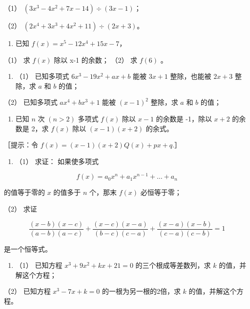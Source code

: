 （1） \((3x^{3} - 4x^{2} + 7x - 14) \div (3x - 1)\)；

（2） \((2x^{4} + 3x^{3} + 4x^{2} + 11) \div (2x + 3)\)。

\begin{enumerate}[start=2]
\item
  已知 \(f(x) = x^5 - 12x^4 + 15x - 7\)，
\end{enumerate}

（1） 求 \(f(x)\) 除以 x-1 的余数； （2） 求 \(f(6)\) 。

\begin{enumerate}[start=3]
\item
  （1） 已知多项式 \(6x^{3} - 19x^{2} + ax + b\) 能被 \(3x + 1\)
  整除，也能被 \(2x + 3\) 整除，求 \(a\) 和 \(b\) 的值；
\end{enumerate}

（2） 已知多项式 \(ax^4 + bx^3 + 1\) 能被 \((x - 1)^2\) 整除，求 \(a\)
和 \(b\) 的值；

\begin{enumerate}[start=4]
\item
  已知 \(n\) 次 \((n > 2)\) 多项式 \(f(x)\) 除以 \(x - 1\) 的余数是
  -1，除以 \(x + 2\) 的余数是 2，求 \(f(x)\) 除以 \((x - 1)(x + 2)\)
  的余式。
\end{enumerate}

［提示：令 \(f(x) = (x - 1)(x + 2)Q(x) + px + q.\)］

\begin{enumerate}[start=5]
\item
  （1） 求证： 如果使多项式
\end{enumerate}

\[
f (x) = a _ {0} x ^ {n} + a _ {1} x ^ {n - 1} + \dots + a _ {n}
\]

的值等于零的 \(x\) 的值多于 \(n\) 个，那末 \(f(x)\) 必恒等于零；

（2） 求证

\[
\frac {(x - b) (x - c)}{(a - b) (a - c)} + \frac {(x - c) (x - a)}{(b - c) (c - a)} + \frac {(x - a) (x - b)}{(c - a) (c - b)} = 1
\]

是一个恒等式。

\begin{enumerate}[start=6]
\item
  （1） 已知方程 \(x^{3} + 9x^{2} + kx + 21 = 0\) 的三个根成等差数列，求
  \(k\) 的值，并解这个方程；
\end{enumerate}

（2） 已知方程 \(x^{3} - 7x + k = 0\) 的一根为另一根的2倍，求 \(k\)
的值，并解这个方程。

